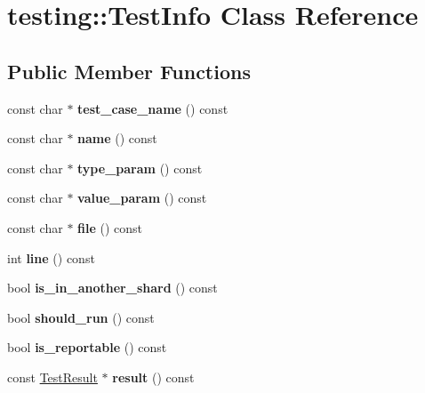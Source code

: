 \hypertarget{classtesting_1_1_test_info}{}\section{testing\+:\+:Test\+Info Class Reference}
\label{classtesting_1_1_test_info}
\subsection*{Public Member Functions}
\begin{DoxyCompactItemize}
\item 
\mbox{\label{classtesting_1_1_test_info_a036a20710c8c2252889544daba9a8ff9}} 
const char $\ast$ {\bfseries test\+\_\+case\+\_\+name} () const
\item 
\mbox{\label{classtesting_1_1_test_info_ac2581b45eccc9a3b94cb41c4807d0e34}} 
const char $\ast$ {\bfseries name} () const
\item 
\mbox{\label{classtesting_1_1_test_info_a7759bc57f4350ad406cbbb0b3bcea320}} 
const char $\ast$ {\bfseries type\+\_\+param} () const
\item 
\mbox{\label{classtesting_1_1_test_info_abdf2c6cfcf4819e725816c64e1c1fc24}} 
const char $\ast$ {\bfseries value\+\_\+param} () const
\item 
\mbox{\label{classtesting_1_1_test_info_a9b74d79cf618ce5bb0d0b1da75ee8b35}} 
const char $\ast$ {\bfseries file} () const
\item 
\mbox{\label{classtesting_1_1_test_info_af5931cfc594b5d660c56b3c61c41ea13}} 
int {\bfseries line} () const
\item 
\mbox{\label{classtesting_1_1_test_info_a8621f2cf7623fd1609db8e324f0c2fec}} 
bool {\bfseries is\+\_\+in\+\_\+another\+\_\+shard} () const
\item 
\mbox{\label{classtesting_1_1_test_info_a866e33b5bc5ab2a6e5375fc7d3af0f96}} 
bool {\bfseries should\+\_\+run} () const
\item 
\mbox{\label{classtesting_1_1_test_info_a63e7042028b0b846f4b5a1e5bcffc079}} 
bool {\bfseries is\+\_\+reportable} () const
\item 
\mbox{\label{classtesting_1_1_test_info_aee8cb884c95cd446129aba936b4159e0}} 
const \mbox{\hyperlink{classtesting_1_1_test_result}{Test\+Result}} $\ast$ {\bfseries result} () const
\end{DoxyCompactItemize}
